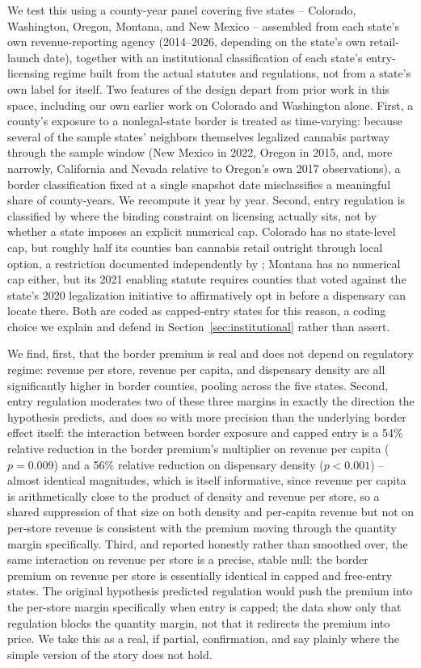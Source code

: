 \documentclass[12pt]{article}
\begin{document}
We test this using a county-year panel covering five states -- Colorado, Washington, Oregon, Montana, and New
Mexico -- assembled from each state's own revenue-reporting agency (2014--2026, depending on the state's own
retail-launch date), together with an institutional classification of each state's entry-licensing regime built
from the actual statutes and regulations, not from a state's own label for itself. Two features of the design
depart from prior work in this space, including our own earlier work on Colorado and Washington alone. First,
a county's exposure to a nonlegal-state border is treated as time-varying: because several of the sample
states' neighbors themselves legalized cannabis partway through the sample window (New Mexico in 2022, Oregon
in 2015, and, more narrowly, California and Nevada relative to Oregon's own 2017 observations), a border
classification fixed at a single snapshot date misclassifies a meaningful share of county-years. We recompute
it year by year. Second, entry regulation is classified by where the binding constraint on licensing actually
sits, not by whether a state imposes an explicit numerical cap. Colorado has no state-level cap, but roughly
half its counties ban cannabis retail outright through local option, a restriction documented independently by
\citet{PayanBrownSong2021}; Montana has no numerical cap either, but its 2021 enabling statute requires
counties that voted against the state's 2020 legalization initiative to affirmatively opt in before a
dispensary can locate there. Both are coded as capped-entry states for this reason, a coding choice we explain
and defend in Section~\ref{sec:institutional} rather than assert.

We find, first, that the border premium is real and does not depend on regulatory regime: revenue per store,
revenue per capita, and dispensary density are all significantly higher in border counties, pooling across the
five states. Second, entry regulation moderates two of these three margins in exactly the direction the
hypothesis predicts, and does so with more precision than the underlying border effect itself: the interaction
between border exposure and capped entry is a 54\% relative reduction in the border premium's multiplier on
revenue per capita ($p=0.009$) and a 56\% relative reduction on dispensary density ($p<0.001$) -- almost identical magnitudes, which
is itself informative, since revenue per capita is arithmetically close to the product of density and revenue
per store, so a shared suppression of that size on both density and per-capita revenue but not on per-store
revenue is consistent with the premium moving through the quantity margin specifically. Third, and reported
honestly rather than smoothed over, the same interaction on revenue per store is a precise, stable null: the
border premium on revenue per store is essentially identical in capped and free-entry states. The original
hypothesis predicted regulation would push the premium into the per-store margin specifically when entry is
capped; the data show only that regulation blocks the quantity margin, not that it redirects the premium into
price. We take this as a real, if partial, confirmation, and say plainly where the simple version of the story
does not hold.
\end{document}
